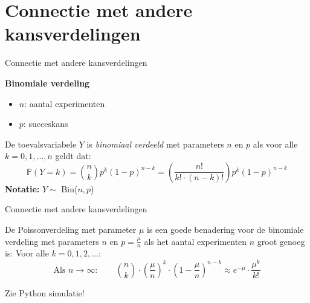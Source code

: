 \documentclass{beamer}
\newcommand{\probability}{\mathbb{P}}
\begin{document}
	\section{Connectie met andere kansverdelingen}
	
	\begin{frame}{Connectie met andere kansverdelingen}
		\begin{center}
			\textbf{Binomiale verdeling}
		\end{center}
	
		\begin{itemize}
			\item $n$: aantal experimenten
			\item $p$: succeskans
		\end{itemize}
	
		\vfill
	
		De toevalsvariabele $Y$ is \textit{binomiaal verdeeld} met parameters $n$ en $p$ als voor alle $k = 0, 1, \ldots, n$ geldt dat:
		\[\probability(Y = k) = \binom{n}{k} p^{k}(1-p)^{n-k} = \left(\frac{n!}{k!\cdot(n-k)!}\right) p^{k}(1-p)^{n-k} \]
		\textbf{Notatie:} $Y \sim $ Bin($n,p$)
	\end{frame}
	
	\begin{frame}{Connectie met andere kansverdelingen}
		
		De Poissonverdeling met parameter $\mu$ is een goede benadering voor de binomiale verdeling met parameters $n$ en $p = \frac{\mu}{n}$ als het aantal experimenten $n$ groot genoeg is:
		\vfill
		Voor alle $k = 0, 1, 2, \ldots$:
		\[ 
			 \text{Als } n \to \infty:\qquad \binom{n}{k} \cdot (\frac{\mu}{n})^{k} \cdot (1-\frac{\mu}{n})^{n-k} \approx e^{-\mu} \cdot \frac{\mu^{k}}{k!} 
		\]
				\vfill 
		\begin{center}
			Zie Python simulatie!
		\end{center}	
	\end{frame}

%		
%		
\end{document}
